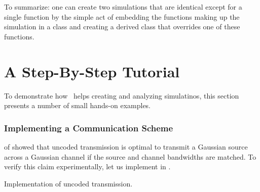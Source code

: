 To summarize: one can create two simulations that are identical except for a
single function by the simple act of embedding the functions making up the
simulation in a class and creating a derived class that overrides one of these
functions.


\section{A Step-By-Step Tutorial}\label{sec:tutorial}

To demonstrate how \jscsim\ helps creating and analyzing simulatinos, this
section presents a number of small hands-on examples.


\subsubsection{Implementing a Communication Scheme}

 of  showed that uncoded transmission is
optimal to transmit a Gaussian source across a Gaussian channel if the source
and channel bandwidths are matched. To verify this claim experimentally, let us
implement  in \jscsim. 

\begin{listing}
  \caption{Implementation of uncoded transmission.}
  \label{lst:uncoded}
\end{listing}

